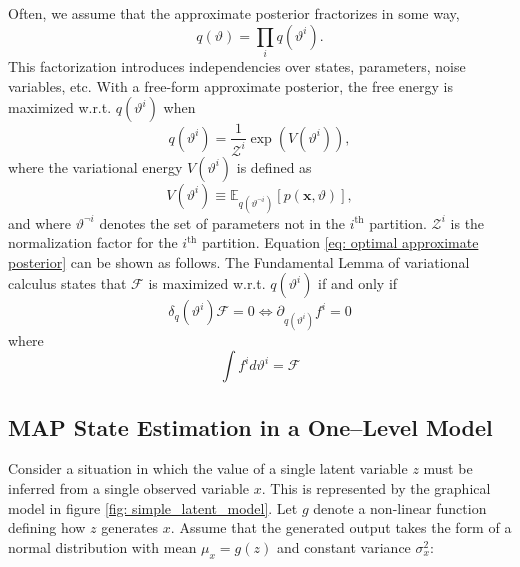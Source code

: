 Often, we assume that the approximate posterior fractorizes in some way,
\begin{equation}
	q (\vartheta) = \prod_i q (\vartheta^i).
\end{equation}
This factorization introduces independencies over states, parameters, noise variables, etc. With a free-form approximate posterior, the free energy is maximized w.r.t. $q (\vartheta^i)$ when
\begin{equation}
	q (\vartheta^i) = \frac{1}{\mathcal{Z}^i} \exp (V(\vartheta^i)),
	\label{eq: optimal approximate posterior}
\end{equation}
where the variational energy $V(\vartheta^i)$ is defined as
\begin{equation}
	V(\vartheta^i) \equiv \mathbb{E}_{q (\vartheta^{\neg i})} \left[ p ( \mathbf{x} , \vartheta) \right],
\end{equation}
and where $\vartheta^{\neg i}$ denotes the set of parameters not in the $i^\text{th}$ partition. $\mathcal{Z}^i$ is the normalization factor for the $i^\text{th}$ partition. Equation \ref{eq: optimal approximate posterior} can be shown as follows. The Fundamental Lemma of variational calculus states that $\mathcal{F}$ is maximized w.r.t. $q (\vartheta^i)$ if and only if
\begin{equation}
	\delta_q (\vartheta^i) \mathcal{F} = 0 \Leftrightarrow \partial_{q (\vartheta^i)} f^i = 0
\end{equation}
where
\begin{equation}
	\int f^i d \vartheta^i = \mathcal{F}
\end{equation}


\subsection{MAP State Estimation in a One--Level Model}

Consider a situation in which the value of a single latent variable $z$ must be inferred from a single observed variable $x$. This is represented by the graphical model in figure  \ref{fig: simple_latent_model}. Let $g$ denote a non-linear function defining how $z$ generates $x$. Assume that the generated output takes the form of a normal distribution with mean $\mu_x = g(z)$ and constant variance $\sigma^2_x$:


